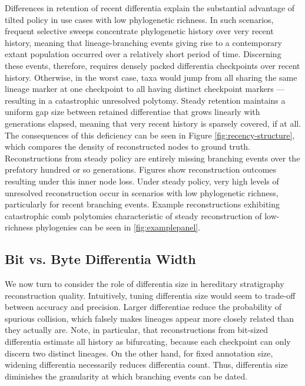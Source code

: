 Differences in retention of recent differentia explain the substantial advantage of tilted policy in use cases with low phylogenetic richness.
In such scenarios, frequent selective sweeps concentrate phylogenetic history over very recent history, meaning that lineage-branching events giving rise to a contemporary extant population occurred over a relatively short period of time.
Discerning these events, therefore, requires densely packed differentia checkpoints over recent history.
Otherwise, in the worst case, taxa would jump from all sharing the same lineage marker at one checkpoint to all having distinct checkpoint markers --- resulting in a catastrophic unresolved polytomy.
Steady retention maintains a uniform gap size between retained differentiae that grows linearly with generations elapsed, meaning that very recent history is sparsely covered, if at all.
The consequences of this deficiency can be seen in Figure \ref{fig:recency-structure}, which compares the density of reconstructed nodes to ground truth.
Reconstructions from steady policy are entirely missing branching events over the prefatory hundred or so generations.
Figures  show reconstruction outcomes resulting under this inner node loss.
Under steady policy, very high levels of unresolved reconstruction occur in scenarios with low phylogenetic richness, particularly for recent branching events.
Example reconstructions exhibiting catastrophic comb polytomies characteristic of steady reconstruction of low-richness phylogenies can be seen in \ref{fig:examplepanel}.

\subsection{Bit vs. Byte Differentia Width} \label{sec:bit-vs-byte}



We now turn to consider the role of differentia size in hereditary stratigraphy reconstruction quality.
Intuitively, tuning differentia size would seem to trade-off between accuracy and precision.
Larger differentiae reduce the probability of spurious collision, which falsely makes lineages appear more closely related than they actually are.
Note, in particular, that reconstructions from bit-sized differentia estimate all history as bifurcating, because each checkpoint can only discern two distinct lineages.
On the other hand, for fixed annotation size, widening differentia necessarily reduces differentia count.
Thus, differentia size diminishes the granularity at which branching events can be dated.

